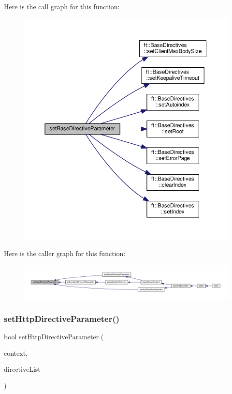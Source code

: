 Here is the call graph for this function\+:
\nopagebreak
\begin{figure}[H]
\begin{center}
\leavevmode
\includegraphics[width=350pt]{classft_1_1_parser_a9f412d172694519d0d8dd9edacd257c0_cgraph}
\end{center}
\end{figure}
Here is the caller graph for this function\+:
\nopagebreak
\begin{figure}[H]
\begin{center}
\leavevmode
\includegraphics[width=350pt]{classft_1_1_parser_a9f412d172694519d0d8dd9edacd257c0_icgraph}
\end{center}
\end{figure}
\mbox{\label{classft_1_1_parser_a5d287909e4c513e20b017ba0699b0cbf}} 
\subsubsection{\texorpdfstring{set\+Http\+Directive\+Parameter()}{setHttpDirectiveParameter()}}
{\footnotesize\ttfamily bool set\+Http\+Directive\+Parameter (\begin{DoxyParamCaption}\item[{\hyperlink{classft_1_1_http_block}{Http\+Block} \&}]{context,  }\item[{std\+::vector$<$ \hyperlink{classft_1_1_directive}{Directive} $>$}]{directive\+List }\end{DoxyParamCaption})}



